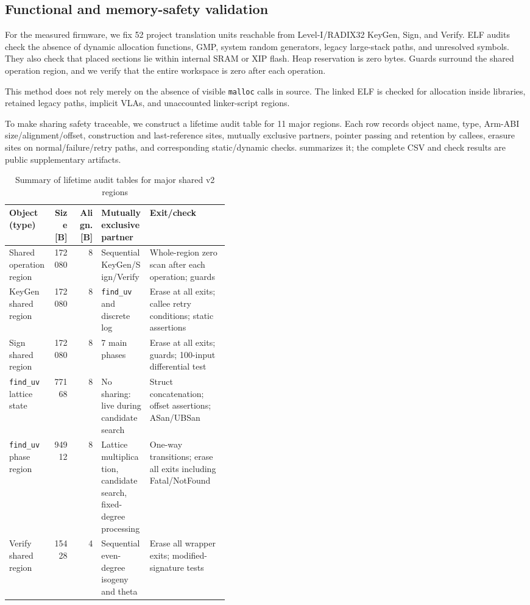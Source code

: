 \documentclass[a4paper,10pt]{article}
\theoremstyle{definition}
\theoremstyle{remark}
\begin{document}
\subsection{Functional and memory-safety validation}

For the measured firmware, we fix 52 project translation units reachable from Level-I/RADIX32 KeyGen, Sign, and Verify. ELF audits check the absence of dynamic allocation functions, GMP, system random generators, legacy large-stack paths, and unresolved symbols. They also check that placed sections lie within internal SRAM or XIP flash. Heap reservation is zero bytes. Guards surround the shared operation region, and we verify that the entire workspace is zero after each operation.

This method does not rely merely on the absence of visible \texttt{malloc} calls in source. The linked ELF is checked for allocation inside libraries, retained legacy paths, implicit VLAs, and unaccounted linker-script regions.

To make sharing safety traceable, we construct a lifetime audit table for 11 major regions. Each row records object name, type, Arm-ABI size/alignment/offset, construction and last-reference sites, mutually exclusive partners, pointer passing and retention by callees, erasure sites on normal/failure/retry paths, and corresponding static/dynamic checks.  summarizes it; the complete CSV and check results are public supplementary artifacts.

\begin{table}[H]
  \centering
  \caption{Summary of lifetime audit tables for major shared v2 regions}
  \label{tab:lifetime-certificate}
  \scriptsize
  \begin{tabularx}{\linewidth}{@{}p{0.20\linewidth}r r p{0.22\linewidth}X@{}}
    \toprule
    Object (type) & Size [B] & Align. [B] & Mutually exclusive partner & Exit/check \\
    \midrule
    Shared operation region & \num{172080} & 8 & Sequential KeyGen/Sign/Verify & Whole-region zero scan after each operation; guards \\
    KeyGen shared region & \num{172080} & 8 & \texttt{find\_uv} and discrete log & Erase at all exits; callee retry conditions; static assertions \\
    Sign shared region & \num{172080} & 8 & 7 main phases & Erase at all exits; guards; 100-input differential test \\
    \texttt{find\_uv} lattice state & \num{77168} & 8 & No sharing: live during candidate search & Struct concatenation; offset assertions; ASan/UBSan \\
    \texttt{find\_uv} phase region & \num{94912} & 8 & Lattice multiplication, candidate search, fixed-degree processing & One-way transitions; erase all exits including Fatal/NotFound \\
    Verify shared region & \num{15428} & 4 & Sequential even-degree isogeny and theta & Erase all wrapper exits; modified-signature tests \\
    \bottomrule
  \end{tabularx}
\end{table}
\end{document}
